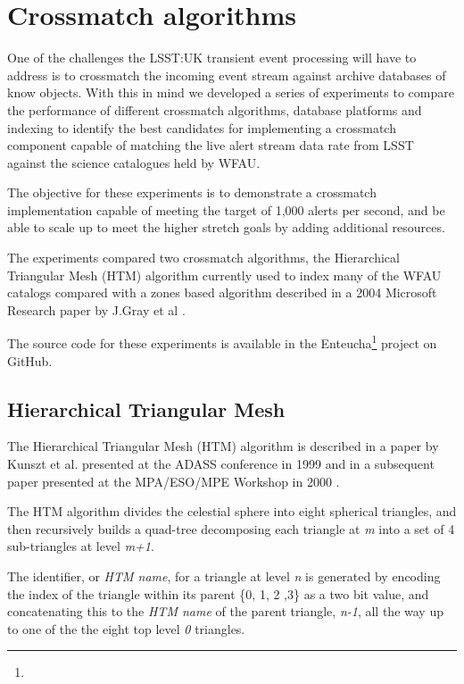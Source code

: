 \documentclass{article}
\newcommand{\enteucha} {Enteucha\xspace}
\newcommand{\github} {GitHub\xspace}
\newcommand{\crossmatch} {crossmatch\xspace}
\newcommand{\lsst} {LSST\xspace}
\newcommand{\lsstuk} {LSST:UK\xspace}
\newcommand{\wfau} {WFAU\xspace}
\newcommand{\footurl}[1] {\footnote{\burl{#1}}}
\begin{document}
\section{Crossmatch algorithms}
\label{crossmatch-algorithms}

One of the challenges the \lsstuk transient event processing will have to address is to \crossmatch the incoming event stream against archive databases of know objects. With this in mind we developed a series of experiments to compare the performance of different \crossmatch algorithms, database platforms and indexing to identify the best candidates for implementing a \crossmatch component capable of matching the live alert stream data rate from \lsst against the science catalogues held by \wfau.

The objective for these experiments is to demonstrate a \crossmatch implementation capable of meeting the target of 1,000 alerts per second, and be able to scale up to meet the higher stretch goals by adding additional resources.

The experiments compared two \crossmatch algorithms, the Hierarchical Triangular Mesh (HTM)
algorithm currently used to index many of the \wfau catalogs compared with a zones based algorithm described in a 2004 Microsoft Research paper by J.Gray et al \cite{Gray-2004}.

The source code for these experiments is available in the \enteucha \footurl{https://github.com/lsst-uk/enteucha} project on \github.

\subsection{Hierarchical Triangular Mesh}
\label{crossmatch.htm}

The Hierarchical Triangular Mesh (HTM) algorithm is described in a paper by Kunszt et al. presented at the ADASS conference in 1999 \cite{Kunszt-1999} and in a subsequent paper presented at the MPA/ESO/MPE Workshop in 2000 \cite{Kunszt-2000}.

The HTM algorithm divides the celestial sphere into eight spherical triangles, and then recursively builds a quad-tree decomposing each triangle at \textit{m} into a set of 4 sub-triangles at level \textit{m+1}.

The identifier, or \textit{HTM name}, for a triangle at level \textit{n} is generated by encoding the index of the triangle within its parent \{0, 1, 2 ,3\}  as a two bit value, and concatenating this to the \textit{HTM name} of the parent triangle, \textit{n-1}, all the way up to one of the the eight top level \textit{0} triangles.
\end{document}
